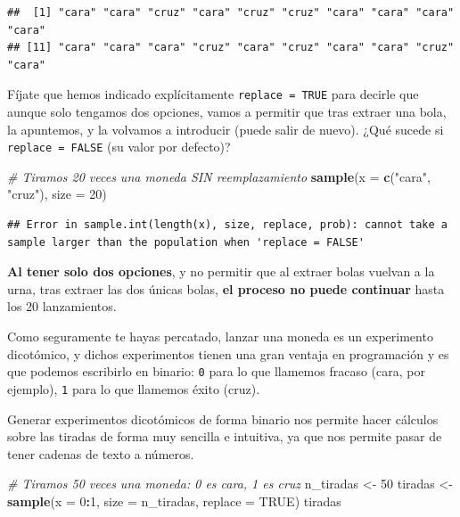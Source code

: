 \documentclass[11pt,]{book}
\newenvironment{Shaded}{\begin{snugshade}}{\end{snugshade}}
\newcommand{\CommentTok}[1]{\textcolor[rgb]{0.37,0.37,0.37}{\textit{#1}}}
\newcommand{\DataTypeTok}[1]{\textcolor[rgb]{0.27,0.27,0.27}{#1}}
\newcommand{\DecValTok}[1]{\textcolor[rgb]{0.06,0.06,0.06}{#1}}
\newcommand{\KeywordTok}[1]{\textcolor[rgb]{0.27,0.27,0.27}{\textbf{#1}}}
\newcommand{\NormalTok}[1]{#1}
\newcommand{\OperatorTok}[1]{\textcolor[rgb]{0.43,0.43,0.43}{\textbf{#1}}}
\newcommand{\OtherTok}[1]{\textcolor[rgb]{0.37,0.37,0.37}{#1}}
\newcommand{\StringTok}[1]{\textcolor[rgb]{0.5,0.5,0.5}{#1}}
\begin{document}
\begin{verbatim}
##  [1] "cara" "cara" "cruz" "cara" "cruz" "cruz" "cara" "cara" "cara" "cara"
## [11] "cara" "cara" "cara" "cruz" "cara" "cruz" "cara" "cara" "cruz" "cara"
\end{verbatim}

Fíjate que hemos indicado explícitamente \texttt{replace\ =\ TRUE} para decirle que aunque solo tengamos dos opciones, vamos a permitir que tras extraer una bola, la apuntemos, y la volvamos a introducir (puede salir de nuevo). ¿Qué sucede si \texttt{replace\ =\ FALSE} (su valor por defecto)?

\begin{Shaded}
\begin{Highlighting}[]
\CommentTok{# Tiramos 20 veces una moneda SIN reemplazamiento}
\KeywordTok{sample}\NormalTok{(}\DataTypeTok{x =} \KeywordTok{c}\NormalTok{(}\StringTok{"cara"}\NormalTok{, }\StringTok{"cruz"}\NormalTok{), }\DataTypeTok{size =} \DecValTok{20}\NormalTok{)}
\end{Highlighting}
\end{Shaded}

\begin{verbatim}
## Error in sample.int(length(x), size, replace, prob): cannot take a sample larger than the population when 'replace = FALSE'
\end{verbatim}

\textbf{Al tener solo dos opciones}, y no permitir que al extraer bolas vuelvan a la urna, tras extraer las dos únicas bolas, \textbf{el proceso no puede continuar} hasta los 20 lanzamientos.

Como seguramente te hayas percatado, lanzar una moneda es un experimento dicotómico, y dichos experimentos tienen una gran ventaja en programación y es que podemos escribirlo en binario: \texttt{0} para lo que llamemos fracaso (cara, por ejemplo), \texttt{1} para lo que llamemos éxito (cruz).

Generar experimentos dicotómicos de forma binario nos permite hacer cálculos sobre las tiradas de forma muy sencilla e intuitiva, ya que nos permite pasar de tener cadenas de texto a números.

\begin{Shaded}
\begin{Highlighting}[]
\CommentTok{# Tiramos 50 veces una moneda: 0 es cara, 1 es cruz}
\NormalTok{n_tiradas <-}\StringTok{ }\DecValTok{50}
\NormalTok{tiradas <-}\StringTok{ }\KeywordTok{sample}\NormalTok{(}\DataTypeTok{x =} \DecValTok{0}\OperatorTok{:}\DecValTok{1}\NormalTok{, }\DataTypeTok{size =}\NormalTok{ n_tiradas, }\DataTypeTok{replace =} \OtherTok{TRUE}\NormalTok{)}
\NormalTok{tiradas}
\end{Highlighting}
\end{Shaded}
\end{document}

